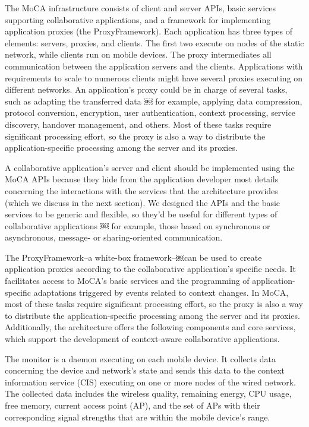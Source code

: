 \documentclass[twocolumn]{article}
\begin{document}
The MoCA infrastructure consists of client and server APIs, basic services supporting collaborative applications, and a framework for implementing application proxies (the ProxyFramework). Each application has three types of elements: servers, proxies, and clients. The first two execute on nodes of the static network, while clients run on mobile devices. The proxy intermediates all communication between the application servers and the clients. Applications with requirements to scale to numerous clients might have several proxies executing on different networks. An application's proxy could be in charge of several tasks, such as adapting the transferred data ￼ for example, applying data compression, protocol conversion, encryption, user authentication, context processing, service discovery, handover management, and others. Most of these tasks require significant processing effort, so the proxy is also a way to distribute the application-specific processing among the server and its proxies.

A collaborative application's server and client should be implemented using the MoCA APIs because they hide from the application developer most details concerning the interactions with the services that the architecture provides (which we discuss in the next section). We designed the APIs and the basic services to be generic and flexible, so they'd be useful for different types of collaborative applications ￼ for example, those based on synchronous or asynchronous, message- or sharing-oriented communication.

The ProxyFramework--a white-box framework--￼can be used to create application proxies according to the collaborative application's specific needs. It facilitates access to MoCA's basic services and the programming of application-specific adaptations triggered by events related to context changes.
In MoCA, most of these tasks require significant processing effort, so the proxy is also a way to distribute the application-specific processing among the server and its proxies.
Additionally, the architecture offers the following components and core services, which support the development of context-aware collaborative applications.

The monitor is a daemon executing on each mobile device. It collects data concerning the device and network's state and sends this data to the context information service (CIS) executing on one or more nodes of the wired network. The collected data includes the wireless quality, remaining energy, CPU usage, free memory, current access point (AP), and the set of APs with their corresponding signal strengths that are within the mobile device's range.
\end{document}
